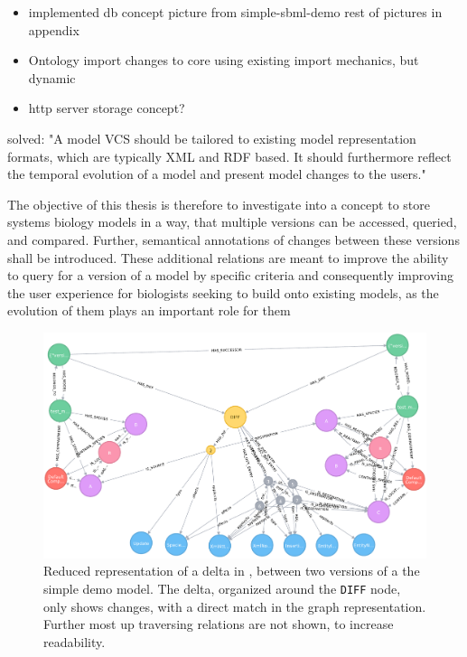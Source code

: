 
\begin{itemize}
	\item implemented db concept
		\subitem picture from simple-sbml-demo
		\subitem rest of pictures in appendix
	\item Ontology import
		\subitem changes to \masymos core
		\subitem using existing import mechanics, but dynamic
	\item http server storage concept?
\end{itemize}



solved:
"A model VCS should be tailored to existing model representation formats, which are typically XML and RDF based. It should furthermore reflect the temporal evolution of a model and present model changes to the users." \citep{Waltemath2013}

The objective of this thesis is therefore to investigate into a concept to store systems biology models in a way, that multiple versions can be accessed, queried, and compared. Further, semantical annotations of changes between these versions shall be introduced. These additional relations are meant to improve the ability to query for a version of a model by specific criteria and consequently improving the user experience for biologists seeking to build onto existing models, as the evolution of them plays an important role for them \citep{Scharm2015}

\begin{figure}
	\centering
	\includegraphics[width=\textwidth]{resources/neo4j-renders/demo-sbml-simple-diff.pdf}
	\caption[Reduced representation of a delta in \masymos, between two versions of a the simple \sbml demo model]{Reduced representation of a delta in \masymos, between two versions of a the simple \sbml demo model. The delta, organized around the \texttt{DIFF} node, only shows changes, with a direct match in the graph representation. Further most up traversing relations are not shown, to increase readability.}
	\label{fig:results:simple-diff}
	
\end{figure}